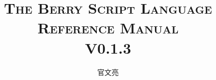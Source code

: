 
\newcommand\nbvspace[1][3]{\vspace*{\stretch{#1}}}
\newcommand\nbstretchyspace{\spaceskip0.5em plus 0.25em minus 0.25em}
\newcommand{\nbtitlestretch}{\spaceskip0.6em}

\newcommand{\cndash}{\raisebox{0.5mm}{------}}

\begin{titlepage}

    \title{\ebgaramond\Huge{\scshape The Berry Script Language\\Reference Manual}\\\Large{V0.1.3}}

    \author{官文亮}

    \maketitle

\end{titlepage}
